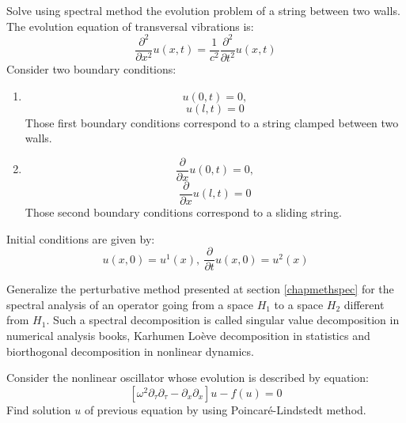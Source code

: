 \documentclass[12pt]{book}
\begin{document}
\begin{exo}\label{exocordespec}
Solve using spectral method the evolution problem of a string between
two walls. The evolution equation of transversal vibrations is:
\begin{equation}
\frac{\partial^{2}}{\partial
x^{2}}u(x,t)=\frac{1}{c^2}\frac{\partial^{2}}{\partial t^{2}}u(x,t)
\end{equation}
Consider two boundary conditions:
\begin{enumerate}
\item 
\begin{equation}
u(0,t)=0,
\end{equation}
\begin{equation}
u(l,t)=0
\end{equation}
Those first boundary conditions correspond to a string clamped between
two walls.
\item 
\begin{equation}
\frac{\partial}{\partial x}u(0,t)=0, 
\end{equation}
\begin{equation}
\frac{\partial}{\partial x}u(l,t)=0
\end{equation}
Those second boundary conditions correspond to a sliding string. 
\end{enumerate}
Initial conditions are given by:
\begin{equation}
u(x,0)=u^1(x),\:\frac{\partial}{\partial t}u(x,0)=u^2(x)
\end{equation}
\end{exo}


\begin{exo}
Generalize the perturbative method presented at section \ref{chapmethspec}
for the spectral analysis of an operator going from a space $H_{1}$ to a space
$H_{2}$ different from $H_1$. 
Such a spectral decomposition is called singular value decomposition in
numerical analysis books, Karhumen Lo\`eve decomposition in statistics and 
biorthogonal decomposition in nonlinear dynamics.
\end{exo}


\begin{exo}\label{exopoincalin}
Consider the nonlinear oscillator whose evolution is described by equation:
\begin{equation}
\left[\omega^2\partial_{\tau}\partial_{\tau}-
  \partial_{x}\partial_{x}\right]u-f(u)=0 
\end{equation}
Find solution $u$ of previous equation by using Poincar\'e-Lindstedt method.
\end{exo}
\end{document}

